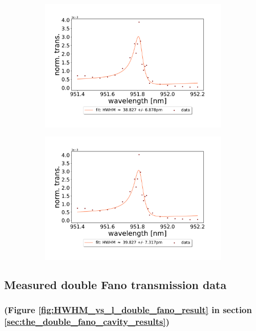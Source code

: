 \begin{figure}[h!]
\begin{subfigure}[b]{0.49\textwidth}
        \includegraphics[width=\textwidth]{figures/results/single fano fits/5um_M5_fit_3.pdf}
        \caption{}
        \label{fig:5um_M5_fit_3}
    \end{subfigure}
    \begin{subfigure}[b]{0.49\textwidth}
        \includegraphics[width=\textwidth]{figures/results/single fano fits/5um_M5_fit_4.pdf}
        \caption{}
        \label{fig:5um_M5_fit_4}
    \end{subfigure}
\end{figure}

\clearpage
\subsection{Measured double Fano transmission data}

\subsubsection*{(Figure \ref{fig:HWHM_vs_l_double_fano_result} in section \ref{sec:the_double_fano_cavity_results})}

